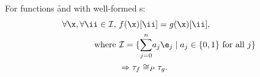 \begin{lemma}
For \simd{} functions \f and \g with well-formed \kfunc{}s:
    \begin{align*}
        \forall \x,\forall \ii \in \mathcal{I},\ &f(\x)[\ii] = g(\x)[\ii], \\
        \text{ where } &\mathcal{I} = \{\text{$\sum_{j=0}^n$} a_j \e_j \mid a_j \in \{0,1\} \text{ for all } j\} \\
        & \Rightarrow \tau_f \cong_P \tau_g.
    \end{align*}


\label{lemma:mappingeq}
\end{lemma}

